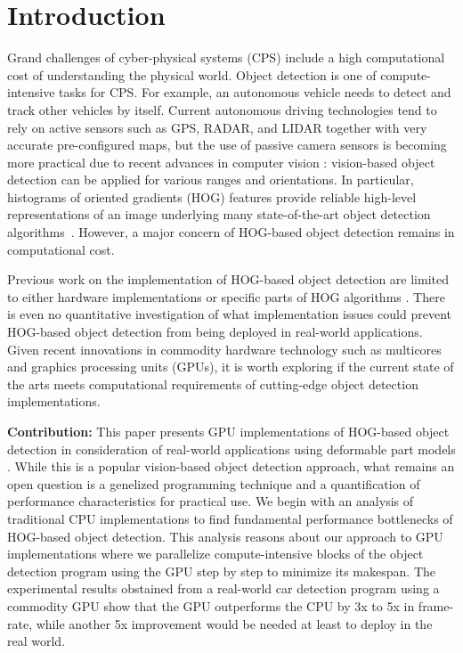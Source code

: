 \section{Introduction}
\label{sec:introduction}

Grand challenges of cyber-physical systems (CPS) include a high
computational cost of understanding the physical world.
Object detection is one of compute-intensive tasks for CPS.
For example, an autonomous vehicle needs to detect and track other
vehicles by itself.
Current autonomous driving technologies \cite{Guizzo11, Levinson11,
Urmson08} tend to rely on active sensors such as GPS, RADAR, and LIDAR
\cite{Kirchner00, Streller02} together with very accurate pre-configured
maps, but the use of passive camera sensors is becoming more practical
due to recent advances in computer vision \cite{Dalal05, Felzenszwalb05,
Felzenszwalb10}: vision-based object detection can be applied for
various ranges and orientations.
In particular, histograms of oriented gradients (HOG) \cite{Dalal05}
features provide reliable high-level representations of an image
underlying many state-of-the-art object detection
algorithms~\cite{Felzenszwalb10, Geiger12, Rybski10, Suard06, Zhu06}.
However, a major concern of HOG-based object detection remains in
computational cost.

Previous work on the implementation of HOG-based object detection are
limited to either hardware implementations \cite{Kadota09, Karakaya09,
Komorkiewicz12} or specific parts of HOG algorithms \cite{Chen11,
Prisacariu09}.
There is even no quantitative investigation of what implementation
issues could prevent HOG-based object detection from being deployed in
real-world applications.
Given recent innovations in commodity hardware technology such as
multicores and graphics processing units (GPUs), it is worth
exploring if the current state of the arts meets computational
requirements of cutting-edge object detection implementations.

\textbf{Contribution:}
This paper presents GPU implementations of HOG-based object detection in
consideration of real-world applications using deformable part models
\cite{Felzenszwalb10}.
While this is a popular vision-based object detection approach, what
remains an open question is a genelized programming technique and a
quantification of performance characteristics for practical use.
We begin with an analysis of traditional CPU
implementations to find fundamental performance bottlenecks of HOG-based
object detection.
This analysis reasons about our approach to GPU implementations where we
parallelize compute-intensive blocks of the object detection program
using the GPU step by step to minimize its makespan.
The experimental results obstained from a real-world car detection
program using a commodity GPU show that the GPU outperforms the CPU by
3x to 5x in frame-rate, while another 5x improvement would be needed
at least to deploy in the real world.

